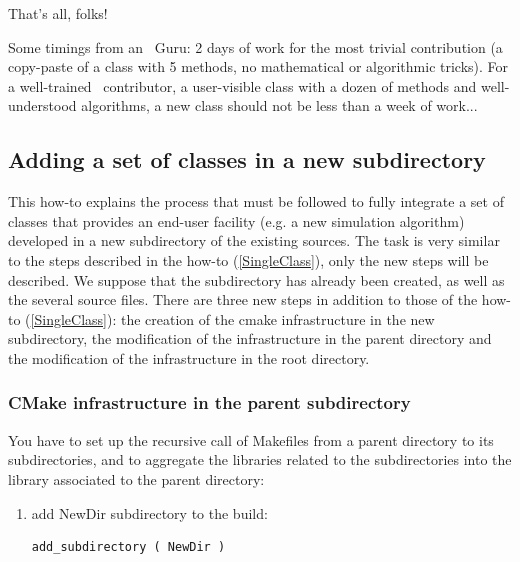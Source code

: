 That's all, folks!

Some timings from an \OT\ Guru: 2 days of work for the most trivial contribution (a copy-paste of a class with 5 methods, no mathematical or algorithmic tricks).
For a well-trained \OT\ contributor, a user-visible class with a dozen of methods and well-understood algorithms, a new class should not be less than a week of work...

\subsection{Adding a set of classes in a new subdirectory \label{WholeDirectory}}

This how-to explains the process that must be followed to fully integrate a set of classes that provides an end-user facility (e.g. a new simulation algorithm) developed in a new subdirectory of the existing sources. The task is very similar to the steps described in the how-to (\ref{SingleClass}), only the new steps will be described. We suppose that the subdirectory has already been created, as well as the several source files. There are three new steps in addition to those of the how-to (\ref{SingleClass}): the creation of the cmake infrastructure in the new subdirectory, the modification of the infrastructure in the parent directory and the modification of the infrastructure in the root directory.

\subsubsection{CMake infrastructure in the parent subdirectory}
You have to set up the recursive call of Makefiles from a parent directory to its subdirectories, and to aggregate the libraries related to the subdirectories into the library associated to the parent directory:
\begin{enumerate}
\item add NewDir subdirectory to the build:
\begin{lstlisting}
add_subdirectory ( NewDir )
\end{lstlisting}

\end{enumerate}

